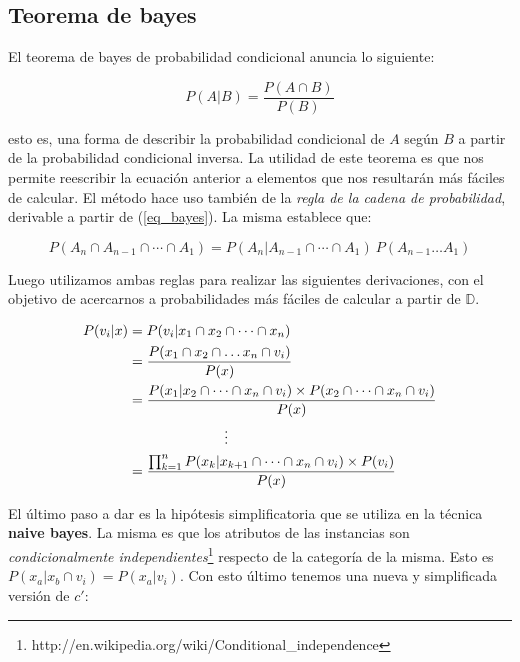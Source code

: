 \documentclass[a4paper,10pt]{article}
\begin{document}
\subsection{Teorema de bayes}

El teorema de bayes de probabilidad condicional anuncia lo siguiente:

\begin{equation}\label{eq_bayes}
P(A | B) = \frac{P(A \cap B)}{P(B)}
\end{equation}

esto es, una forma de describir la probabilidad condicional de $A$ según $B$ a partir de la probabilidad condicional inversa. La utilidad de este teorema es que nos permite reescribir la ecuación anterior a elementos que nos resultarán más fáciles de calcular. El método hace uso también de la \emph{regla de la cadena de probabilidad}, derivable a partir de (\ref{eq_bayes}). La misma establece que:

\begin{equation}\label{eq_chain}
P(A_n \cap A_{n-1} \cap \cdots \cap A_1) = P(A_n | A_{n-1} \cap \cdots \cap A_1) \  P(A_{n-1} \dots A_1)
\end{equation}

Luego utilizamos ambas reglas para realizar las siguientes derivaciones, con el objetivo de acercarnos a probabilidades más fáciles de calcular a partir de $\mathbb{D}$.

\begin{align}
P(v_i | x) &= P(v_i | x_1 \cap x_2 \cap \dots \cap x_n) \\
 &= \frac{P(x_1 \cap x_2 \cap \dots x_n \cap v_i)}{P(x)} \\
 &= \frac{P(x_1 | x_2 \cap \dots \cap x_n \cap v_i) \times P(x_2 \cap \dots \cap x_n \cap v_i) }{P(x)}  \\
  &\hspace{0.2\textwidth} {} \vdots \\
 &= \frac{\prod^{n}_{k=1} P(x_k | x_{k+1} \cap \dots \cap x_n \cap v_i) \times P(v_i) }{P(x)} 
\end{align}

El último paso a dar es la hipótesis simplificatoria que se utiliza en la técnica \textbf{naive bayes}. La misma es que los atributos de las instancias son \emph{condicionalmente independientes}\footnote{http://en.wikipedia.org/wiki/Conditional\_independence} respecto de la categoría de la misma. Esto es $P(x_a | x_b \cap v_i) = P(x_a | v_i)$. Con esto último tenemos una nueva y simplificada versión de $c'$:
\end{document}
